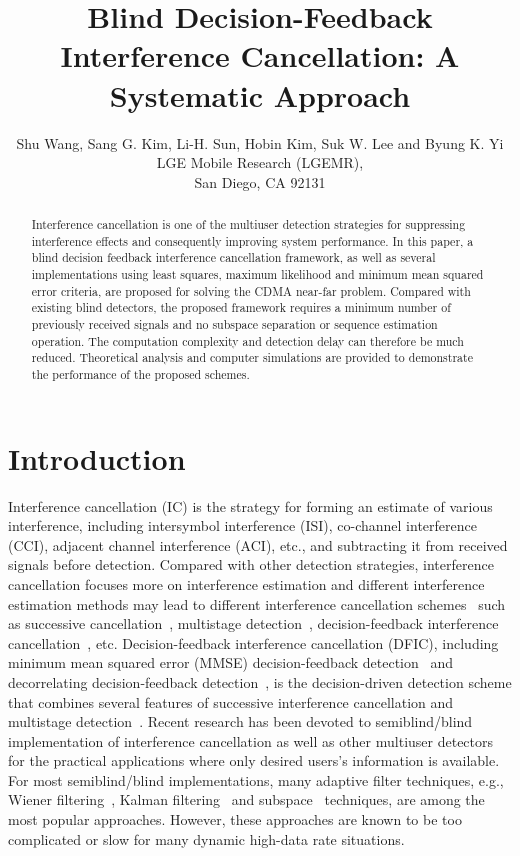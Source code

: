 \documentclass[a4paper,10pt,fleqn, twocolumn]{IEEETran}
\title{Blind Decision-Feedback Interference Cancellation: A Systematic Approach}
\author{Shu Wang, Sang G. Kim, Li-H. Sun, Hobin Kim, Suk W. Lee and Byung K. Yi\\ LGE Mobile Research (LGEMR),\\ San Diego, CA 92131}
\date{}
\begin{document}
\maketitle
\begin{abstract}\small
Interference cancellation is one of the multiuser detection
strategies for suppressing interference effects and consequently
improving system performance. In this paper, a blind decision
feedback interference cancellation framework, as well as several
implementations using least squares, maximum likelihood and
minimum mean squared error criteria, are proposed for solving the
CDMA near-far problem. Compared with existing blind detectors, the
proposed framework requires a minimum number of previously
received signals and no subspace separation or sequence estimation
operation. The computation complexity and detection delay can
therefore be much reduced. Theoretical analysis and computer
simulations are provided to demonstrate the performance of the
proposed schemes.
\end{abstract}
\section{Introduction}
Interference cancellation (IC) is the strategy for forming an
estimate of various interference, including intersymbol
interference (ISI), co-channel interference (CCI), adjacent
channel interference (ACI), etc., and subtracting it from received
signals before detection. Compared with other detection
strategies, interference cancellation focuses more on interference
estimation and different interference estimation methods may lead
to different interference cancellation
schemes~\cite{Verd98,Wang02b} such as successive
cancellation~\cite{Kohno91}, multistage detection~\cite{Vara88},
decision-feedback interference cancellation~\cite{Kave85,Duel95},
etc. Decision-feedback interference cancellation (DFIC), including
minimum mean squared error (MMSE) decision-feedback
detection~\cite{Kave85} and decorrelating decision-feedback
detection~\cite{Duel95}, is the decision-driven detection scheme
that combines several features of successive interference
cancellation and multistage detection~\cite{Verd98}. Recent
research has been devoted to semiblind/blind implementation of
interference cancellation as well as other multiuser
detectors~\cite{Madh94,Madh98,Wang98,Zhang02} for the practical
applications where only desired users's information is available.
For most semiblind/blind implementations, many adaptive filter
techniques, e.g., Wiener filtering~\cite{Madh94}, Kalman
filtering~\cite{Zhang02} and subspace~\cite{Wang98} techniques,
are among the most popular approaches. However, these approaches
are known to be too complicated or slow for many dynamic high-data
rate situations.
\end{document}
